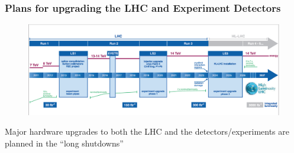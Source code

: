 \begin{frame}
\frametitle{Plans for upgrading the LHC and Experiment Detectors}

\begin{figure}[htbp]
\begin{center}
\includegraphics[width=1.0\textwidth]{images/lhc-upgrade-timeline-detail.png}
\end{center}
\end{figure}

\small{Major hardware upgrades to both the LHC and the detectors/experiments are planned in the ``long shutdowns''}

\end{frame}


